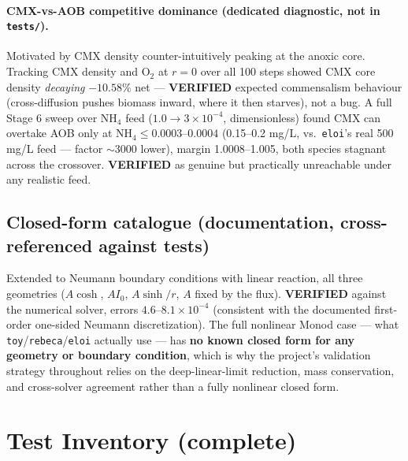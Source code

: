 \documentclass[11pt]{article}
\newcommand{\verified}{\textcolor{green!45!black}{\textbf{VERIFIED}}}
\newcommand{\code}[1]{\texttt{#1}}
\begin{document}
\paragraph{CMX-vs-AOB competitive dominance (dedicated diagnostic, not in \code{tests/}).}
Motivated by CMX density counter-intuitively peaking at the anoxic core.
Tracking CMX density and O$_2$ at $r{=}0$ over all 100 steps showed CMX core
density \emph{decaying} $-10.58\%$ net --- \verified{} expected commensalism
behaviour (cross-diffusion pushes biomass inward, where it then starves), not
a bug. A full Stage 6 sweep over NH$_4$ feed ($1.0\to3\times10^{-4}$,
dimensionless) found CMX can overtake AOB only at NH$_4\le0.0003$--$0.0004$
(0.15--0.2 mg/L, vs.\ \code{eloi}'s real 500 mg/L feed --- factor $\sim$3000
lower), margin 1.0008--1.005, both species stagnant across the crossover.
\verified{} as genuine but practically unreachable under any realistic feed.

\subsection{Closed-form catalogue (documentation, cross-referenced against tests)}
Extended to Neumann boundary conditions with linear reaction, all three
geometries ($A\cosh$, $AI_0$, $A\sinh/r$, $A$ fixed by the flux). \verified{}
against the numerical solver, errors $4.6$--$8.1\times10^{-4}$ (consistent
with the documented first-order one-sided Neumann discretization). The full
nonlinear Monod case --- what \code{toy}/\code{rebeca}/\code{eloi} actually
use --- has \textbf{no known closed form for any geometry or boundary
condition}, which is why the project's validation strategy throughout relies
on the deep-linear-limit reduction, mass conservation, and cross-solver
agreement rather than a fully nonlinear closed form.

\section{Test Inventory (complete)}
\end{document}
